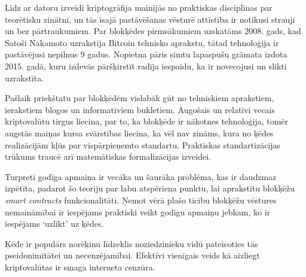 Līdz ar datoru izveidi kriptogrāfija mainījās no praktiskas disciplīnas par teorētisku zinātni, 
un tās īsajā pastāvēšanas vēsturē attīstība ir notikusi strauji un bez pārtraukumiem. Par blokķēdes pirmsākumiem uzskatāms 2008. gads, kad Satoši Nakamoto uzrakstīja Bitcoin tehnisko aprakstu, tātad tehnoloģija ir pastāvējusi nepilnus 9 gadus. Nopietna pāris simtu lapaspušu grāmata izdota 2015. gadā, kuru izdevās pāršķirstīt 
radīja iespaidu, ka ir novecojusi un slikti uzrakstīta.

Pašlaik priekštatu par blokķēdēm vislabāk gūt no tehniskiem aprakstiem, ierakstiem blogos un informatīviem bukletiem. Augošais un relatīvi vecais kriptovalūtu tirgus liecina, par to, ka blokķēde ir nākotnes tehnoloģija, tomēr augstās maiņas kursa svārstības liecina, ka vēl nav zināms, kura no ķēdes realizācijām kļūs par vispārpieņemto standartu. Praktiskas standartizācijas trūkums traucē arī matemātiskas formalizācijas izveidei.

Turpretī godīga apmaiņa ir vecāka un šaurāka problēma, kas ir daudzmaz 
izpētīta, padarot šo teoriju par labu atspēriena punktu, lai aprakstītu blokķēžu \textit{smart contracts} funkcionalitāti. Ņemot vērā plašo ticību blokķēžu vēstures nemaināmībai ir iespējams praktiski veikt godīgu apmaiņu jebkam, ko ir iespējams `uzlikt' uz ķēdes.

Ķēde ir populārs norēķinu līdzeklis noziedzinieku vidū pateicoties tās pseidonimitātei un necenzējamībai. Efektīvi vienīgais veids kā aizliegt kriptovalūtas ir smaga interneta cenzūra.

